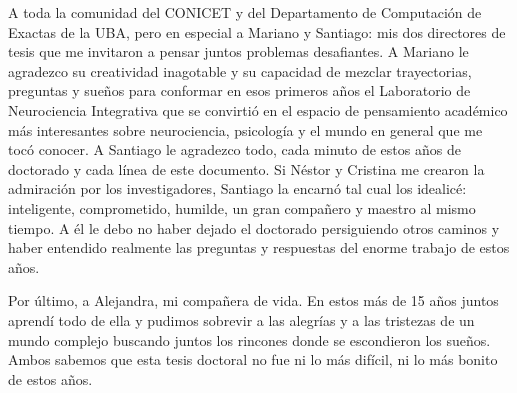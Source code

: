 A toda la comunidad del CONICET y del Departamento de Computación de Exactas de la UBA, pero en especial a Mariano y Santiago: mis dos directores de tesis que me invitaron a pensar juntos problemas desafiantes. A Mariano le agradezco su creatividad inagotable y su capacidad de mezclar trayectorias, preguntas y sueños para conformar en esos primeros años el Laboratorio de Neurociencia Integrativa que se convirtió en el espacio de pensamiento académico más interesantes sobre neurociencia, psicología y el mundo en general que me tocó conocer. A Santiago le agradezco todo, cada minuto de estos años de doctorado y cada línea de este documento. Si Néstor y Cristina me crearon la admiración por los investigadores, Santiago la encarnó tal cual los idealicé: inteligente, comprometido, humilde, un gran compañero y maestro al mismo tiempo. A él le debo no haber dejado el doctorado persiguiendo otros caminos y haber entendido realmente las preguntas y respuestas del enorme trabajo de estos años.

Por último, a Alejandra, mi compañera de vida. En estos más de 15 años juntos aprendí todo de ella y pudimos sobrevir a las alegrías y a las tristezas de un mundo complejo buscando juntos los rincones donde se escondieron los sueños. Ambos sabemos que esta tesis doctoral no fue ni lo más difícil, ni lo más bonito de estos años.